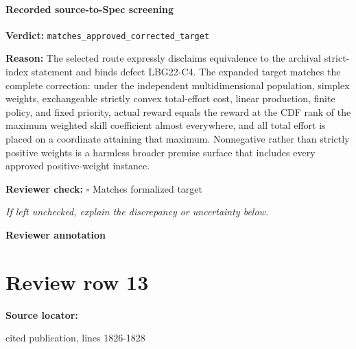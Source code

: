 \documentclass[10pt]{article}
\newcommand{\reviewerbox}{%
  \par\noindent\fbox{\parbox{0.96\linewidth}{\rule{0pt}{0.38in}}}\par
}
\newcommand{\reviewmatch}[1]{%
  \par\noindent\textbf{Reviewer check:} $\square$\; #1\par
  \noindent\emph{If left unchecked, explain the discrepancy or uncertainty below.}\par
}
\begin{document}
\paragraph{Recorded source-to-Spec screening}
\textbf{Verdict:} \texttt{matches\_approved\_corrected\_target}
\\
{\raggedright
\textbf{Reason:} The selected route expressly disclaims equivalence to the archival strict-\allowbreak{}index statement and binds defect LBG22-\allowbreak{}C4.\allowbreak{} The expanded target matches the complete correction:\allowbreak{} under the independent multidimensional population, simplex weights, exchangeable strictly convex total-\allowbreak{}effort cost, linear production, finite policy, and fixed priority, actual reward equals the reward at the CDF rank of the maximum weighted skill coefficient almost everywhere, and all total effort is placed on a coordinate attaining that maximum.\allowbreak{} Nonnegative rather than strictly positive weights is a harmless broader premise surface that includes every approved positive-\allowbreak{}weight instance.\allowbreak{}
\par}
\reviewmatch{Matches formalized target}
\noindent\textbf{Reviewer annotation}\par
\reviewerbox
\clearpage
\hypertarget{source-claim-ef5c828d0d65c93b}{}
\section*{Review row 13}
\textbf{Source locator:} {\footnotesize\raggedright cited publication, lines 1826-\allowbreak{}1828\par}
\end{document}
